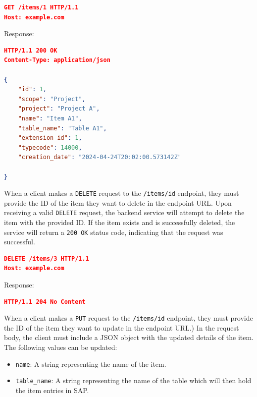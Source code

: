 \begin{lstlisting}[language=json,label={lst:lstlisting9}]
GET /items/1 HTTP/1.1
Host: example.com
\end{lstlisting}

Response:

\begin{lstlisting}[language=json,label={lst:lstlisting10}]
HTTP/1.1 200 OK
Content-Type: application/json

{
    "id": 1,
    "scope": "Project",
    "project": "Project A",
    "name": "Item A1",
    "table_name": "Table A1",
    "extension_id": 1,
    "typecode": 14000,
    "creation_date": "2024-04-24T20:02:00.573142Z"

}
\end{lstlisting}


When a client makes a \texttt{DELETE} request to the \texttt{/items/{id}} endpoint, they must provide the ID of the item they want to delete in the endpoint URL.
Upon receiving a valid \texttt{DELETE} request, the backend service will attempt to delete the item with the provided ID.
If the item exists and is successfully deleted, the service will return a \texttt{200 OK} status code, indicating that the request was successful.

\begin{lstlisting}[language=json,label={lst:lstlisting7}]
DELETE /items/3 HTTP/1.1
Host: example.com
\end{lstlisting}

Response:

\begin{lstlisting}[language=json,label={lst:lstlisting8}]
HTTP/1.1 204 No Content
\end{lstlisting}


When a client makes a \texttt{PUT} request to the \texttt{/items/{id}} endpoint, they must provide the ID of the item they want to update in the endpoint URL.)
In the request body, the client must include a JSON object with the updated details of the item.
The following values can be updated:
\begin{itemize}
    \item \texttt{name}: A string representing the name of the item.
    \item \texttt{table\_name}: A string representing the name of the table which will then hold the item entries in SAP.
\end{itemize}

